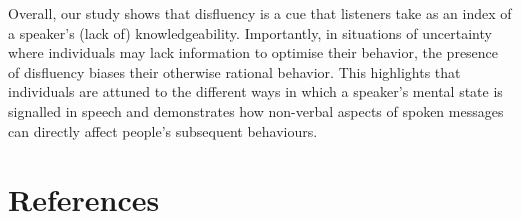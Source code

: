 \documentclass[
  man,floatsintext]{apa7}
\begin{document}
Overall, our study shows that disfluency is a cue that listeners take as an index of a speaker's (lack of) knowledgeability. Importantly, in situations of uncertainty where individuals may lack information to optimise their behavior, the presence of disfluency biases their otherwise rational behavior. This highlights that individuals are attuned to the different ways in which a speaker's mental state is signalled in speech and demonstrates how non-verbal aspects of spoken messages can directly affect people's subsequent behaviours.

\newpage

\hypertarget{references}{%
\section{References}\label{references}}
\end{document}
